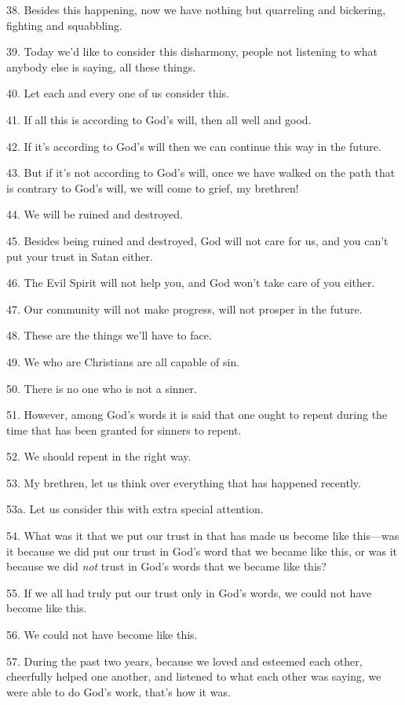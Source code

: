 38. Besides this happening, now we have nothing but quarreling and bickering, fighting
and squabbling.

39. Today we'd like to consider this disharmony, people not listening to what anybody
else is saying, all these things.

40. Let each and every one of us consider this.

41. If all this is according to God's will, then all well and good.

42. If it's according to God's will then we can continue this way in the future.

43. But if it's not according to God's will, once we have walked on the path that
is contrary to God's will, we will come to grief, my brethren!

44. We will be ruined and destroyed.

45. Besides being ruined and destroyed, God will not care for us, and you can't
put your trust in Satan either.

46. The Evil Spirit will not help you, and God won't take care of you either.

47. Our community will not make progress, will not prosper in the future.

48. These are the things we'll have to face.

49. We who are Christians are all capable of sin.

50. There is no one who is not a sinner.

51. However, among God's words it is said that one ought to repent during the time
that has been granted for sinners to repent.

52. We should repent in the right way.

53. My brethren, let us think over everything that has happened recently.

53a. Let us consider this with extra special attention.

54. What was it that we put our trust in that has made us become like this---was
it because we did put our trust in God's word that we became like this, or was
it because we did \textit{not} trust in God's words that we became like this?

55. If we all had truly put our trust only in God's words, we could not have become
like this.

56. We could not have become like this.

57. During the past two years, because we loved and esteemed each other, cheerfully
helped one another, and listened to what each other was saying, we were able to
do God's work, that's how it was.

